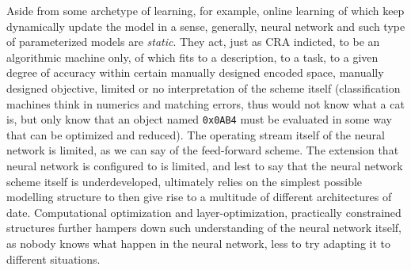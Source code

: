 Aside from some archetype of learning, for example, online learning of which keep dynamically update the model in a sense, generally, neural network and such type of parameterized models are \textit{static}. They act, just as CRA indicted, to be an algorithmic machine only, of which fits to a description, to a task, to a given degree of accuracy within certain manually designed encoded space, manually designed objective, limited or no interpretation of the scheme itself (classification machines think in numerics and matching errors, thus would not know what a cat is, but only know that an object named \texttt{0x0AB4} must be evaluated in some way that can be optimized and reduced). The operating stream itself of the neural network is limited, as we can say of the feed-forward scheme. The extension that neural network is configured to is limited, and lest to say that the neural network scheme itself is underdeveloped, ultimately relies on the simplest possible modelling structure to then give rise to a multitude of different architectures of date. Computational optimization and layer-optimization, practically constrained structures further hampers down such understanding of the neural network itself, as nobody knows what happen in the neural network, less to try adapting it to different situations. 

